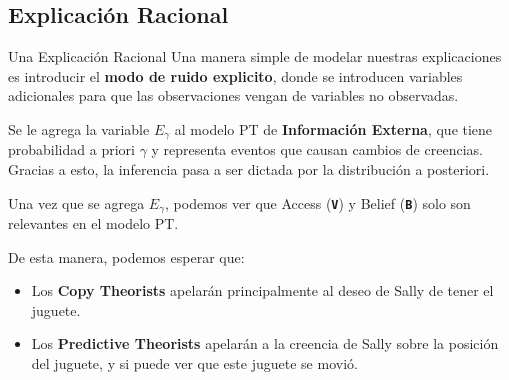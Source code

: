\documentclass{beamer}
\begin{document}
\subsection{Explicación Racional}

\begin{frame}{Una Explicación Racional}
Una manera simple de modelar nuestras explicaciones es introducir el \textbf{modo de ruido explicito}, donde se introducen variables adicionales para que las observaciones vengan de variables no observadas.

Se le agrega la variable \( E_\gamma \) al modelo PT de \textbf{Información Externa}, que tiene probabilidad a priori \( \gamma \) y representa eventos que causan cambios de creencias. Gracias a esto, la inferencia pasa a ser dictada por la distribución a posteriori.
\end{frame}

\begin{frame}
Una vez que se agrega \( E_\gamma \), podemos ver que Access (\texttt{\textbf{V}}) y Belief (\texttt{\textbf{B}}) solo son relevantes en el modelo PT\@.

De esta manera, podemos esperar que:
\begin{itemize}
	\item<2-3> Los \textbf{Copy Theorists} apelarán principalmente al deseo de Sally de tener el juguete.
	\item<3-3> Los \textbf{Predictive Theorists} apelarán a la creencia de Sally sobre la posición del juguete, y si puede ver que este juguete se movió.
\end{itemize}
\end{frame}
\end{document}
